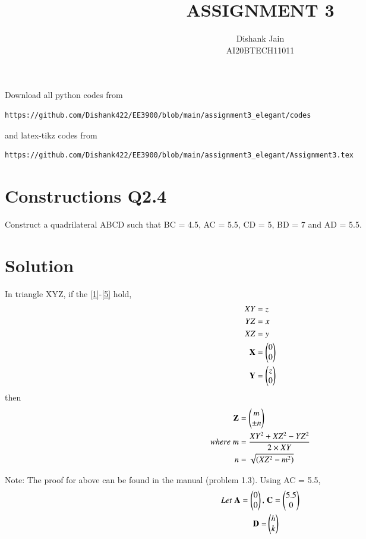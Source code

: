 \documentclass[journal,12pt,twocolumn]{IEEEtran}
\begin{document}
     \def\centbox#1{\makebox[0in]{#1}}
     \def\topbox#1{\raisebox{-\baselineskip}[0in][0in]{#1}}
     \def\midbox#1{\raisebox{-0.5\baselineskip}[0in][0in]{#1}}
\vspace{3cm}
\title{ASSIGNMENT 3}
\author{Dishank Jain \\ AI20BTECH11011}
\maketitle
\newpage
\bigskip
\renewcommand{\thefigure}{\theenumi}
\renewcommand{\thetable}{\theenumi}
Download all python codes from 
\begin{lstlisting}
https://github.com/Dishank422/EE3900/blob/main/assignment3_elegant/codes
\end{lstlisting}
%
and latex-tikz codes from 
%
\begin{lstlisting}
https://github.com/Dishank422/EE3900/blob/main/assignment3_elegant/Assignment3.tex
\end{lstlisting}
%
\section{Constructions Q2.4}
Construct a quadrilateral ABCD such that BC = 4.5, AC = 5.5, CD = 5, BD = 7  and AD = 5.5.

\section{Solution}
\begin{lemma}
In triangle XYZ, if the \ref{1}-\ref{5} hold, 
\begin{align}
    XY &= z\label{1}\\
    YZ &= x\label{2}\\
    XZ &= y\label{3}\\
    \mathbf{X} &= \begin{pmatrix}0\\0\end{pmatrix}\label{4}\\
    \mathbf{Y} &= \begin{pmatrix}z\\0\end{pmatrix}\label{5}
\end{align}
then 
\begin{align}
    \mathbf{Z} &= \begin{pmatrix}m\\ \pm n\end{pmatrix}\\
    where\; m &= \dfrac{XY^2+XZ^2-YZ^2}{2\times XY}\\
    n &= \sqrt{(XZ^2-m^2)}
\end{align}
\end{lemma}
Note: The proof for above can be found in the manual (problem 1.3).
Using AC = 5.5,
\begin{align}
    Let\; \mathbf{A} = \begin{pmatrix}0\\0\end{pmatrix},\; &\mathbf{C} = \begin{pmatrix}5.5\\0\end{pmatrix}\\
    \mathbf{D} = &\begin{pmatrix}h\\k\end{pmatrix}
\end{align}
\end{document}
